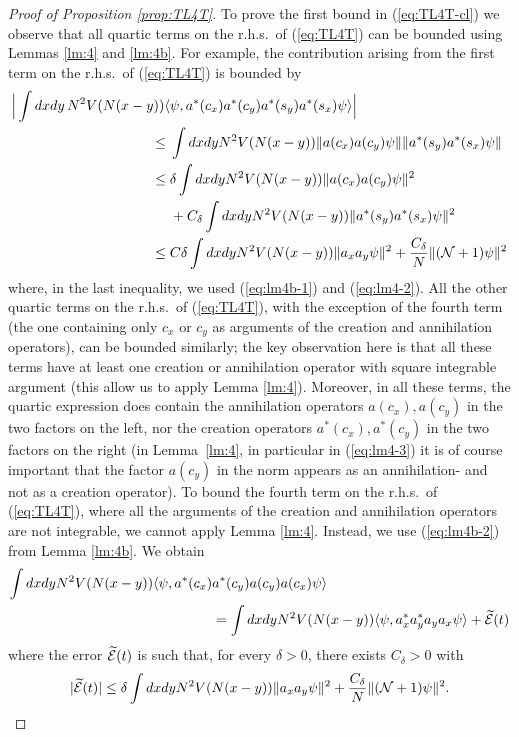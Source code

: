 \documentclass[11pt,a4paper]{article}
\newcommand{\wt}{\widetilde}
\newcommand{\cE}{{\cal E}}
\newcommand{\cN}{{\cal N}}
\begin{document}
\begin{proof}[Proof of Proposition \ref{prop:TL4T}] 
To prove the first bound in (\ref{eq:TL4T-cl}) we observe that all quartic terms on the r.h.s.\ of (\ref{eq:TL4T}) can be bounded using Lemmas \ref{lm:4} and \ref{lm:4b}. For example, the contribution arising from the 
first term on the r.h.s.\ of (\ref{eq:TL4T}) is bounded by
\[ \begin{split} 
\Big| \int dx dy \,  N^2 V (N (x-y)) \langle &\psi ,  a^* (c_x) a^* (c_y) a^* (s_y) a^* (s_x) \psi \rangle \Big| \\\leq \; & \int dx dy N^2 V(N (x-y)) \| a (c_x) a (c_y) \psi \| \| a^* (s_y) a^* (s_x) \psi \| \\
\leq \; & \delta \int dx dy N^2 V (N (x-y)) \| a (c_x) a(c_y) \psi \|^2 \\ &+C_\delta \int dx dy N^2 V(N (x-y)) \| a^* (s_y) a^* (s_x) \psi \|^2 \\
\leq \; & C \delta \int dx dy N^2 V (N (x-y)) \| a_x a_y \psi \|^2 + \frac{C_\delta}{N} \|(\cN+1) \psi \|^2 \end{split} \]
where, in the last inequality, we used (\ref{eq:lm4b-1})  and (\ref{eq:lm4-2}). All the other quartic terms on the r.h.s.\ of (\ref{eq:TL4T}), with the exception of the fourth term (the one containing only $c_x$ or $c_y$ as arguments of the creation and annihilation operators), can be bounded similarly; the key observation here is that all these terms have at least one creation or annihilation operator with square integrable argument (this allow us to apply Lemma \ref{lm:4}). Moreover, in all these terms, the quartic expression does contain the annihilation operators $a(c_x), a(c_y)$ in the two factors on the left, nor the creation operators $a^* (c_x), a^*  (c_y)$ in the two factors on the right (in Lemma~\ref{lm:4}, in particular in (\ref{eq:lm4-3}) it is of course important that the factor $a(c_y)$ in the norm appears as an annihilation- and not as a creation operator). To bound the fourth term on the r.h.s.\ of (\ref{eq:TL4T}), where all the arguments of the creation and annihilation operators are not integrable, we cannot apply Lemma \ref{lm:4}. Instead, we use (\ref{eq:lm4b-2}) from Lemma \ref{lm:4b}. We obtain
\[ \begin{split}  \int dx dy N^2 V(N(x-y)) \langle \psi, a^* (c_x) &a^* (c_y) a(c_y) a(c_x) \psi \rangle \\ &=  \int dx dy N^2 V(N (x-y)) \langle \psi , a_x^* a_y^* a_y a_x \psi \rangle + \wt{\cE} (t) \end{split} \]
where the error $\wt{\cE} (t)$ is such that, for every $\delta > 0$, there exists $C_\delta >0$ with
\[ |\wt{\cE} (t)| \leq  \delta \int dx dy N^2 V(N (x-y)) \| a_x a_y \psi \|^2 + \frac{C_\delta}{N} \| (\cN+1) \psi \|^2. \]


\end{proof}
\end{document}
